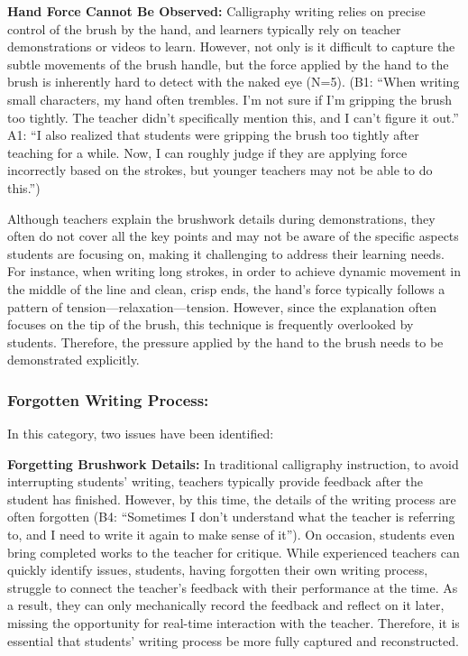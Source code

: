\textbf{Hand Force Cannot Be Observed:} Calligraphy writing relies on precise control of the brush by the hand, and learners typically rely on teacher demonstrations or videos to learn. However, not only is it difficult to capture the subtle movements of the brush handle, but the force applied by the hand to the brush is inherently hard to detect with the naked eye (N=5). (B1: ``When writing small characters, my hand often trembles. I'm not sure if I'm gripping the brush too tightly. The teacher didn't specifically mention this, and I can't figure it out.'' A1: ``I also realized that students were gripping the brush too tightly after teaching for a while. Now, I can roughly judge if they are applying force incorrectly based on the strokes, but younger teachers may not be able to do this.'')

Although teachers explain the brushwork details during demonstrations, they often do not cover all the key points and may not be aware of the specific aspects students are focusing on, making it challenging to address their learning needs. For instance, when writing long strokes, in order to achieve dynamic movement in the middle of the line and clean, crisp ends, the hand's force typically follows a pattern of tension—relaxation—tension. However, since the explanation often focuses on the tip of the brush, this technique is frequently overlooked by students. Therefore, the pressure applied by the hand to the brush needs to be demonstrated explicitly.

\subsubsection{Forgotten Writing Process: }In this category, two issues have been identified: 

\textbf{Forgetting Brushwork Details:} In traditional calligraphy instruction, to avoid interrupting students' writing, teachers typically provide feedback after the student has finished. However, by this time, the details of the writing process are often forgotten (B4: ``Sometimes I don't understand what the teacher is referring to, and I need to write it again to make sense of it''). On occasion, students even bring completed works to the teacher for critique. While experienced teachers can quickly identify issues, students, having forgotten their own writing process, struggle to connect the teacher's feedback with their performance at the time. As a result, they can only mechanically record the feedback and reflect on it later, missing the opportunity for real-time interaction with the teacher. Therefore, it is essential that students' writing process be more fully captured and reconstructed.

